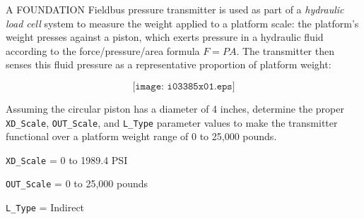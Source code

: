 

A FOUNDATION Fieldbus pressure transmitter is used as part of a {\it hydraulic load cell} system to measure the weight applied to a platform scale: the platform's weight presses against a piston, which exerts pressure in a hydraulic fluid according to the force/pressure/area formula $F = PA$.  The transmitter then senses this fluid pressure as a representative proportion of platform weight:

$$\texttt{[image: i03385x01.eps]}$$

Assuming the circular piston has a diameter of 4 inches, determine the proper {\tt XD\_Scale}, {\tt OUT\_Scale}, and {\tt L\_Type} parameter values to make the transmitter functional over a platform weight range of 0 to 25,000 pounds.







{\tt XD\_Scale} = 0 to 1989.4 PSI

\vskip 10pt

{\tt OUT\_Scale} = 0 to 25,000 pounds

\vskip 10pt

{\tt L\_Type} = Indirect











